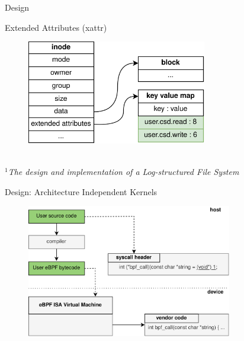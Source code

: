 \documentclass{beamer}
\begin{document}
\begin{frame}{Design}
{\begin{figure}
		\end{figure}
		}
		{\centering Extended Attributes (xattr)
		\begin{figure}
			\centering
			\includegraphics[width=0.7\textwidth]{resources/images/xattr-inode.png}
		\end{figure}
		}
		\\
		\textit{\tiny $^{1}$The design and implementation of a Log-structured File System \\}
	\endgroup
\end{frame}

\begin{frame}{Design: Architecture Independent Kernels}
	\begingroup
	\begin{figure}
		\centering
		\includegraphics[width=0.8\textwidth]{resources/images/ubpf-medium-design.png}
	\end{figure}
	\endgroup
\end{frame}
\end{document}
